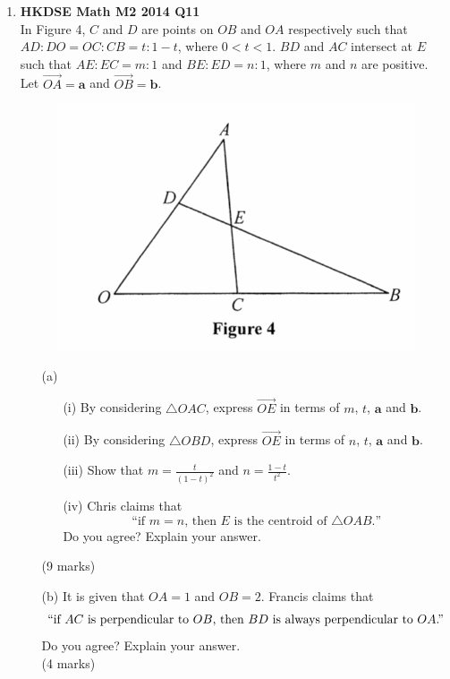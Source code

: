 \documentclass{report}
\begin{document}
\begin{enumerate}
	\item \textbf{HKDSE Math M2 2014 Q11}\\
	In Figure 4, $C$ and $D$ are points on $OB$ and $OA$ respectively such that $AD : DO = OC : CB = t : 1-t$, where $0 < t < 1$. $BD$ and $AC$ intersect at $E$ such that $AE : EC = m : 1 $ and $BE : ED = n : 1 $, where $m$ and $n$ are positive. Let $\overrightarrow{OA} = \textbf{a}$ and $\overrightarrow{OB} = \textbf{b}$. 
	\begin{figure}[H]
		\centering
		\includegraphics[width = .5\linewidth]{2014Figure4}
	\end{figure}
	\begin{enumerate}
		\item [(a)]
		\begin{enumerate}
			\item [(i)]By considering $\triangle OAC$, express $\overrightarrow{OE}$ in terms of $m$, $t$, $\textbf{a}$ and $\textbf{b}$.
			\item [(ii)]By considering $\triangle OBD$, express $\overrightarrow{OE}$ in terms of $n$, $t$, $\textbf{a}$ and $\textbf{b}$.
			\item [(iii)]Show that $\displaystyle m = \frac{t}{(1-t)^2}$ and $\displaystyle n = \frac{1-t}{t^2}$. 
			\item [(iv)]Chris claims that 
				$$\text{``if }m = n\text{, then }E\text{ is the centroid of }\triangle OAB\text{.''}$$
				Do you agree? Explain your answer.
		\end{enumerate}
		(9 marks)
		\item [(b)]It is given that $OA = 1$ and $OB = 2$. Francis claims that 
			$$``\text{if }AC\text{ is perpendicular to }OB\text{, then }BD\text{ is always perpendicular to }OA\text{.''}$$
			Do you agree? Explain your answer. \\(4 marks)
	\end{enumerate}


\end{enumerate}
\end{document}
